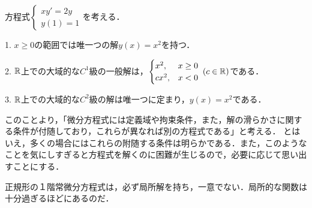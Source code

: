 \documentclass[uplatex,dvipdfmx]{jsreport}
\begin{document}
\begin{example}
    方程式$\begin{cases}
        xy'=2y\\
        y(1)=1
    \end{cases}$を考える．

    1. $x\ge 0$の範囲では唯一つの解$y(x)=x^2$を持つ．

    2. $\mathbb{R}$上での大域的な$C^1$級の一般解は，$\begin{cases}
        x^2, &x\ge 0\\
        cx^2, &x<0
    \end{cases}\;(c\in\mathbb{R})$である．

    3. $\mathbb{R}$上での大域的な$C^2$級の解は唯一つに定まり，$y(x)=x^2$である．
\end{example}
\begin{remark}
    このことより，「微分方程式には定義域や拘束条件，また，解の滑らかさに関する条件が付随しており，これらが異なれば別の方程式である」と考える．
    とはいえ，多くの場合にはこれらの附随する条件は明らかである．また，このようなことを気にしすぎると方程式を解くのに困難が生じるので，必要に応じて思い出すことにする．
\end{remark}

\begin{screen}
    正規形の１階常微分方程式は，必ず局所解を持ち，一意でない．局所的な関数は十分過ぎるほどにあるのだ．
\end{screen}
\end{document}
